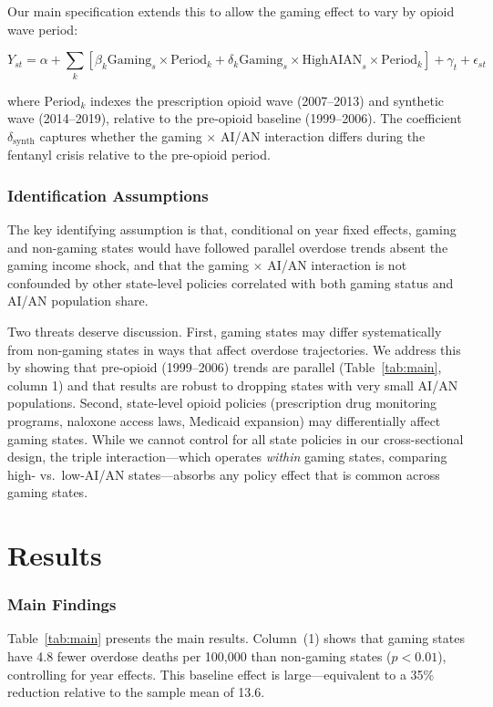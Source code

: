 \documentclass[12pt]{article}
\begin{document}
Our main specification extends this to allow the gaming effect to vary by opioid wave period:

\begin{equation}
    Y_{st} = \alpha + \sum_{k} [\beta_k \text{Gaming}_s \times \text{Period}_k + \delta_k \text{Gaming}_s \times \text{HighAIAN}_s \times \text{Period}_k] + \gamma_t + \epsilon_{st}
\end{equation}

where $\text{Period}_k$ indexes the prescription opioid wave (2007--2013) and synthetic wave (2014--2019), relative to the pre-opioid baseline (1999--2006). The coefficient $\delta_{\text{synth}}$ captures whether the gaming $\times$ AI/AN interaction differs during the fentanyl crisis relative to the pre-opioid period.

\subsubsection*{Identification Assumptions} The key identifying assumption is that, conditional on year fixed effects, gaming and non-gaming states would have followed parallel overdose trends absent the gaming income shock, and that the gaming $\times$ AI/AN interaction is not confounded by other state-level policies correlated with both gaming status and AI/AN population share.

Two threats deserve discussion. First, gaming states may differ systematically from non-gaming states in ways that affect overdose trajectories. We address this by showing that pre-opioid (1999--2006) trends are parallel (Table~\ref{tab:main}, column 1) and that results are robust to dropping states with very small AI/AN populations. Second, state-level opioid policies (prescription drug monitoring programs, naloxone access laws, Medicaid expansion) may differentially affect gaming states. While we cannot control for all state policies in our cross-sectional design, the triple interaction---which operates \textit{within} gaming states, comparing high- vs.\ low-AI/AN states---absorbs any policy effect that is common across gaming states.

\section{Results}

\subsubsection*{Main Findings} Table~\ref{tab:main} presents the main results. Column~(1) shows that gaming states have 4.8 fewer overdose deaths per 100,000 than non-gaming states ($p < 0.01$), controlling for year effects. This baseline effect is large---equivalent to a 35\% reduction relative to the sample mean of 13.6.
\end{document}
